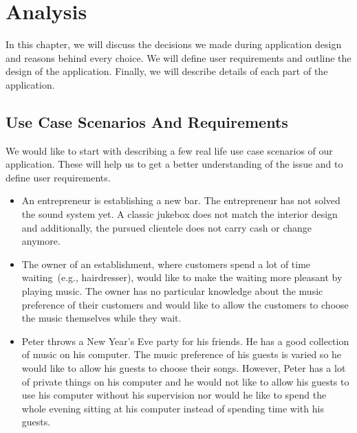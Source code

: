 \chapter{Analysis}

In this chapter, we will discuss the decisions we made during application design and reasons behind every choice. We will define user requirements and outline the design of the application. Finally, we will describe details of each part of the application.

\section{Use Case Scenarios And Requirements}

We would like to start with describing a few real life use case scenarios of our application. These will help us to get a better understanding of the issue and to define user requirements.
\begin{itemize}
    \item An entrepreneur is establishing a new bar. The entrepreneur has not solved the sound system yet. A classic jukebox does not match the interior design and additionally, the pursued clientele does not carry cash or change anymore.
    \item The owner of an establishment, where customers spend a lot of time waiting~(e.g., hairdresser), would like to make the waiting more pleasant by playing music. The owner has no particular knowledge about the music preference of their customers and would like to allow the customers to choose the music themselves while they wait.
    \item Peter throws a New Year's Eve party for his friends. He has a good collection of music on his computer. The music preference of his guests is varied so he would like to allow his guests to choose their songs. However, Peter has a lot of private things on his computer and he would not like to allow his guests to use his computer without his supervision nor would he like to spend the whole evening sitting at his computer instead of spending time with his guests.
\end{itemize}


